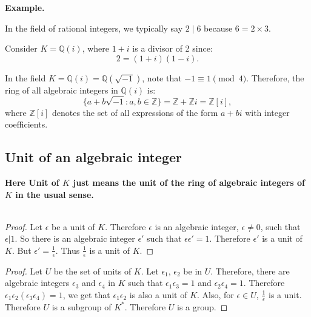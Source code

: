 \documentclass{article}
\newenvironment{example}{%
    \par
    \vspace{5pt}
	\begin{minipage}{\textwidth}
		\noindent\textbf{Example.}
		\tcolorbox[blanker,breakable,left=5mm,parbox=false,
	    before upper={\parindent15pt},
	    after skip=10pt,
		borderline west={1mm}{0pt}{cyan!10!white}]
}{%
		\endtcolorbox
	\end{minipage}
    \vspace{5pt}
}
\begin{document}
\begin{example}
    In the field of rational integers, we typically say \( 2 \mid 6 \) because \( 6 = 2 \times 3 \).
    
    Consider \( K = \mathbb{Q}(i) \), where \( 1 + i \) is a divisor of 2 since:
    \[
    2 = (1 + i)(1 - i).
    \]
    
    In the field \( K = \mathbb{Q}(i) = \mathbb{Q}(\sqrt{-1}) \), note that \( -1 \equiv 1 \pmod{4} \). Therefore, the ring of all algebraic integers in \( \mathbb{Q}(i) \) is:
    \[
    \{ a + b\sqrt{-1} : a, b \in \mathbb{Z} \} = \mathbb{Z} + \mathbb{Z}i = \mathbb{Z}[i],
    \]
    where \( \mathbb{Z}[i] \) denotes the set of all expressions of the form \( a + bi \) with integer coefficients.
    \end{example}

    \subsection{Unit of an algebraic integer}


\textbf{Here Unit of $K$ just means the unit of the ring of algebraic integers of $K$ in the usual sense.}\\\\

\begin{proof}
    Let $\epsilon$ be a unit of $K$. Therefore $\epsilon$ is an 
    algebraic integer, $\epsilon \neq 0$, such that $\epsilon|1$. So there is 
    an algebraic integer $\epsilon'$ such that $\epsilon \epsilon' = 1$.
    Therefore $\epsilon'$ is a unit of $K$.
    But $\epsilon' = \frac{1}{\epsilon}$. Thus
    $\frac{1}{\epsilon}$ is a unit of $K$.
\end{proof}


\begin{proof}
Let $U$ be the set of units of $K$. Let $\epsilon_1$, 
$\epsilon_2$  be in $U$. Therefore, there are algebraic integers 
$\epsilon_3$ and  $\epsilon_4$ in $K$ such that $\epsilon_1 \epsilon_3 = 1$ and
$\epsilon_2 \epsilon_4 = 1$. Therefore $\epsilon_1 \epsilon_2 (\epsilon_3 \epsilon_4) = 1$,
we get that $\epsilon_1 \epsilon_2$ is also a unit of $K$. Also, 
for $\epsilon \in U$, $\frac{1}{\epsilon}$ is a unit. 
Therefore $U$ is a subgroup of $K^{*}$. Therefore $U$ is a group.   
\end{proof}
\end{document}
